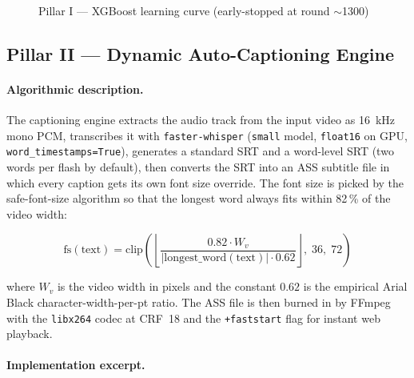 \begin{figure}[H]
\centering
{}
\caption{Pillar I --- XGBoost learning curve (early-stopped at round $\sim$1300)}
\label{fig:learn_curve}
\end{figure}

\subsection{Pillar II --- Dynamic Auto-Captioning Engine}
\label{sec:pillar2}

\paragraph{Algorithmic description.}
The captioning engine extracts the audio track from the input video as 16~kHz mono PCM,
transcribes it with \texttt{faster-whisper} (\texttt{small} model, \texttt{float16} on GPU,
\texttt{word\_timestamps=True}), generates a standard SRT and a word-level SRT (two words per
flash by default), then converts the SRT into an ASS subtitle file in which every caption
gets its own font size override. The font size is picked by the safe-font-size algorithm so
that the longest word always fits within 82\,\% of the video width:

\begin{equation}
\mathrm{fs}(\text{text}) = \mathrm{clip}\!\left(
  \left\lfloor \frac{0.82 \cdot W_v}{|\mathrm{longest\_word}(\text{text})| \cdot 0.62} \right\rfloor,
  \;36,\;72\right)
\label{eq:fs}
\end{equation}

where $W_v$ is the video width in pixels and the constant $0.62$ is the empirical Arial Black
character-width-per-pt ratio. The ASS file is then burned in by FFmpeg with the
\texttt{libx264} codec at CRF~18 and the \texttt{+faststart} flag for instant web playback.

\paragraph{Implementation excerpt.}

